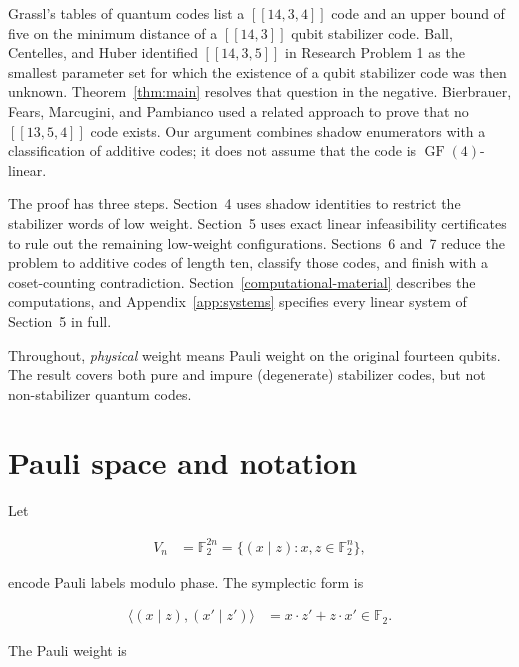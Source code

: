 \documentclass[11pt]{article}
\begin{document}
Grassl's tables of quantum codes \cite{grassl-table} list a \(\left[\!\left[14,3,4\right]\!\right]\) code and an upper bound of five on the minimum distance of a \(\left[\!\left[14,3\right]\!\right]\) qubit stabilizer code. Ball, Centelles, and Huber \cite{ball-centelles-huber} identified \(\left[\!\left[14,3,5\right]\!\right]\) in Research Problem 1 as the smallest parameter set for which the existence of a qubit stabilizer code was then unknown. Theorem~\ref{thm:main} resolves that question in the negative. Bierbrauer, Fears, Marcugini, and Pambianco \cite{bierbrauer-et-al} used a related approach to prove that no \(\left[\!\left[13,5,4\right]\!\right]\) code exists. Our argument combines shadow enumerators \cite{rains-weight,rains-shadow} with a classification of additive codes; it does not assume that the code is \(\operatorname{GF}(4)\)-linear.

The proof has three steps. Section~4 uses shadow identities to restrict the stabilizer words of low weight. Section~5 uses exact linear infeasibility certificates to rule out the remaining low-weight configurations. Sections~6 and~7 reduce the problem to additive codes of length ten, classify those codes, and finish with a coset-counting contradiction. Section~\ref{computational-material} describes the computations, and Appendix~\ref{app:systems} specifies every linear system of Section~5 in full.

Throughout, \emph{physical} weight means Pauli weight on the original fourteen qubits. The result covers both pure and impure (degenerate) stabilizer codes, but not non-stabilizer quantum codes.

\section{Pauli space and notation}\label{pauli-space-and-notation}

Let

\[
\begin{aligned}
V_{n} &=\mathbb{F}_{2}^{2n} = \{(x\mid z): x,z \in \mathbb{F}_{2}^{n}\},
\end{aligned}
\]

encode Pauli labels modulo phase. The symplectic form is

\[
\begin{aligned}
\langle (x\mid z),(x'\mid z') \rangle &=x \cdot z' + z \cdot x' \in \mathbb{F}_{2}.
\end{aligned}
\]

The Pauli weight is
\end{document}

